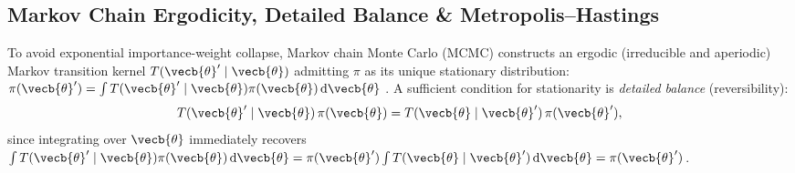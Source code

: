 \documentclass[../../../../master.tex]{subfiles}
\begin{document}
\subsection{Markov Chain Ergodicity, Detailed Balance \& Metropolis--Hastings}
\label{subsec:mcmc:mh}

To avoid exponential importance-weight collapse, Markov chain Monte Carlo (MCMC) constructs an ergodic (irreducible and aperiodic) Markov transition kernel $T(\vecb{\theta}' \mid \vecb{\theta})$ admitting $\pi$ as its unique stationary distribution: $\pi(\vecb{\theta}') = \int T(\vecb{\theta}' \mid \vecb{\theta})\pi(\vecb{\theta})\,\mathrm{d}\vecb{\theta}$ . A sufficient condition for stationarity is \emph{detailed balance} (reversibility):
\begin{equation}
  \label{eq:mcmc:detailed_balance}
  T(\vecb{\theta}' \mid \vecb{\theta})\,\pi(\vecb{\theta}) = T(\vecb{\theta} \mid \vecb{\theta}')\,\pi(\vecb{\theta}'),
\end{equation}
since integrating over $\vecb{\theta}$ immediately recovers $\int T(\vecb{\theta}' \mid \vecb{\theta})\pi(\vecb{\theta})\,\mathrm{d}\vecb{\theta} = \pi(\vecb{\theta}') \int T(\vecb{\theta} \mid \vecb{\theta}')\,\mathrm{d}\vecb{\theta} = \pi(\vecb{\theta}')$.
\end{document}
